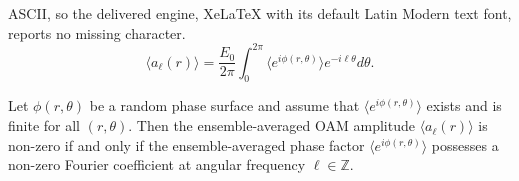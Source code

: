 \documentclass[10pt,a4paper]{amsart}
\newcommand{\ev}[1]{\langle #1 \rangle}
\begin{document}
ASCII, so the delivered engine, XeLaTeX with its default Latin Modern text font, reports no missing character.
\begin{equation}
    \ev{a_\ell(r)} = \frac{E_0}{2\pi} \int_0^{2\pi} \ev{e^{i\phi(r,\theta)}} e^{-i\ell\theta} d\theta.
    \label{eq:ensemble_average}
\end{equation}

\begin{theorem}
Let $\phi(r,\theta)$ be a random phase surface and assume that $\ev{e^{i\phi(r,\theta)}}$ exists and is finite for all $(r,\theta)$. Then the ensemble-averaged OAM amplitude $\ev{a_\ell(r)}$ is non-zero if and only if the ensemble-averaged phase factor $\ev{e^{i\phi(r,\theta)}}$ possesses a non-zero Fourier coefficient at angular frequency $\ell \in \mathbb{Z}$.
\label{theorem:OAM_Selection_Rule}
\end{theorem}
\end{document}
